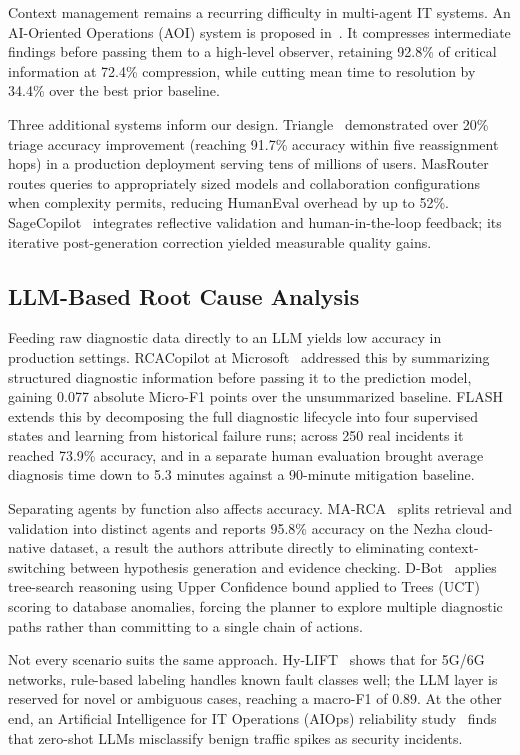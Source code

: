 \documentclass[conference]{IEEEtran}
\begin{document}
Context management remains a recurring difficulty in multi-agent IT systems.
An AI-Oriented Operations (AOI) system is proposed in~\cite{bai2025aoi}. It
compresses intermediate findings before passing them to a high-level observer, retaining 92.8\%
of critical information at 72.4\% compression, while cutting mean time to resolution by 34.4\%
over the best prior baseline.

Three additional systems inform our design. Triangle~\cite{yu2025triangle} demonstrated over 20\% triage
accuracy improvement (reaching 91.7\% accuracy within five
reassignment hops) in a production deployment serving tens of
millions of users. MasRouter~\cite{yue2025masrouter} routes queries to
appropriately sized models and collaboration configurations when
complexity permits, reducing HumanEval overhead by up to 52\%. SageCopilot~\cite{liao2025sagecopilot}
integrates reflective validation and human-in-the-loop feedback;
its iterative post-generation correction yielded measurable quality
gains.

\subsection{LLM-Based Root Cause Analysis}
Feeding raw diagnostic data directly to an LLM yields low accuracy in production settings. RCACopilot at
Microsoft~\cite{chen2024rcacopilot} addressed this by summarizing structured diagnostic
information before passing it to the prediction model, gaining 0.077 absolute Micro-F1 points
over the unsummarized baseline. FLASH~\cite{zhang2024flash} extends this by decomposing the
full diagnostic lifecycle into four supervised states and learning from historical failure
runs; across 250 real incidents it reached 73.9\% accuracy, and in a separate human evaluation
brought average diagnosis time down to 5.3 minutes against a 90-minute mitigation baseline.

Separating agents by function also affects accuracy.
MA-RCA~\cite{fu2026marca} splits retrieval and validation into distinct agents and reports
95.8\% accuracy on the Nezha cloud-native dataset, a result the authors attribute directly
to eliminating context-switching between hypothesis generation and evidence checking.
D-Bot~\cite{zhou2023dbot} applies tree-search reasoning using Upper Confidence bound applied to Trees (UCT) scoring to database
anomalies, forcing the planner to explore multiple diagnostic paths rather
than committing to a single chain of actions.

Not every scenario suits the same approach. Hy-LIFT~\cite{salman2025hylift} shows that for
5G/6G networks, rule-based labeling handles known fault classes well; the LLM layer is reserved
for novel or ambiguous cases, reaching a macro-F1 of 0.89. At the other end,
an Artificial Intelligence for IT Operations (AIOps) reliability study~\cite{szandala2025aiops_reliability} finds that zero-shot LLMs
misclassify benign traffic spikes as security incidents.
\end{document}
